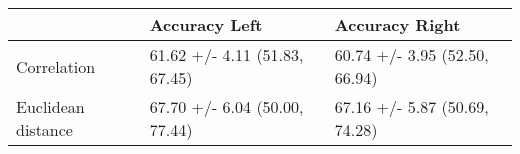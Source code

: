 \begin{tabular}{lll}
\toprule
{} &                  Accuracy Left &                 Accuracy Right \\
\midrule
Correlation        &  61.62 +/- 4.11 (51.83, 67.45) &  60.74 +/- 3.95 (52.50, 66.94) \\
Euclidean distance &  67.70 +/- 6.04 (50.00, 77.44) &  67.16 +/- 5.87 (50.69, 74.28) \\
\bottomrule
\end{tabular}
